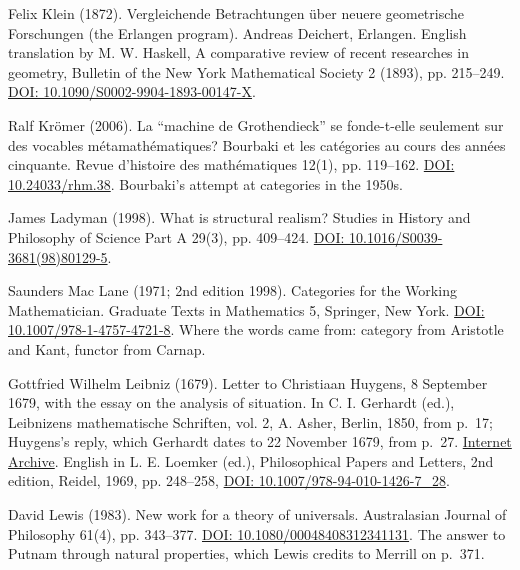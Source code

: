 \documentclass[11pt,twoside]{article}
\theoremstyle{thielethm}
\theoremstyle{thieledef}
\theoremstyle{thieledef}
\theoremstyle{thieledef}
\theoremstyle{thielethm}
\theoremstyle{thieleobs}
\theoremstyle{thielethm}
\begin{document}
\noindent Felix Klein (1872). Vergleichende Betrachtungen \"uber neuere geometrische Forschungen (the Erlangen program). Andreas Deichert, Erlangen. English translation by M. W. Haskell, A comparative review of recent researches in geometry, Bulletin of the New York Mathematical Society 2 (1893), pp. 215--249. \href{https://doi.org/10.1090/S0002-9904-1893-00147-X}{DOI: 10.1090/S0002-9904-1893-00147-X}.
\par\medskip

\noindent Ralf Kr\"omer (2006). La ``machine de Grothendieck'' se fonde-t-elle seulement sur des vocables m\'etamath\'ematiques? Bourbaki et les cat\'egories au cours des ann\'ees cinquante. Revue d'histoire des math\'ematiques 12(1), pp. 119--162. \href{https://doi.org/10.24033/rhm.38}{DOI: 10.24033/rhm.38}. Bourbaki's attempt at categories in the 1950s.
\par\medskip

\noindent James Ladyman (1998). What is structural realism? Studies in History and Philosophy of Science Part A 29(3), pp. 409--424. \href{https://doi.org/10.1016/S0039-3681(98)80129-5}{DOI: 10.1016/S0039-3681(98)80129-5}.
\par\medskip

\noindent Saunders Mac Lane (1971; 2nd edition 1998). Categories for the Working Mathematician. Graduate Texts in Mathematics 5, Springer, New York. \href{https://doi.org/10.1007/978-1-4757-4721-8}{DOI: 10.1007/978-1-4757-4721-8}. Where the words came from: category from Aristotle and Kant, functor from Carnap.
\par\medskip

\noindent Gottfried Wilhelm Leibniz (1679). Letter to Christiaan Huygens, 8 September 1679, with the essay on the analysis of situation. In C. I. Gerhardt (ed.), Leibnizens mathematische Schriften, vol. 2, A. Asher, Berlin, 1850, from p.~17; Huygens's reply, which Gerhardt dates to 22 November 1679, from p.~27. \href{https://archive.org/details/leibnizensmathe08leibgoog}{Internet Archive}. English in L. E. Loemker (ed.), Philosophical Papers and Letters, 2nd edition, Reidel, 1969, pp. 248--258, \href{https://doi.org/10.1007/978-94-010-1426-7_28}{DOI: 10.1007/978-94-010-1426-7\_28}.
\par\medskip

\noindent David Lewis (1983). New work for a theory of universals. Australasian Journal of Philosophy 61(4), pp. 343--377. \href{https://doi.org/10.1080/00048408312341131}{DOI: 10.1080/00048408312341131}. The answer to Putnam through natural properties, which Lewis credits to Merrill on p.~371.
\par\medskip
\end{document}
